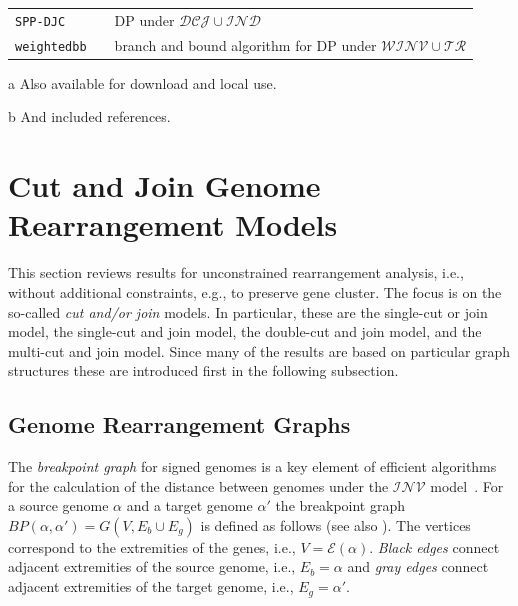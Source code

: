 \documentclass{svmult}
\newcommand{\m}[1]{\mathcal{#1}}
\begin{document}
\begin{table}
\begin{center}
\begin{threeparttable}
\begin{tabular}{l l p{7.2cm}}
		\texttt{SPP-DJC} & \cite{SPP-DJC} & DP under
    $\m{DCJ}\cup\m{IND}$\\
    \texttt{weightedbb} & \cite{Bader_2008,PHYLO}\tnote{b} & branch and
    bound algorithm for DP under $\m{WINV}\cup\m{TR}$\\
    \hline
  \end{tabular}
  \label{table:tools}
  \begin{tablenotes}
    \item[a] Also available for download and local use.
    \item[b] And included references.
\end{tablenotes}
\end{threeparttable}
\end{center}
\end{table}


\section{Cut and Join Genome Rearrangement Models}
\label{sec:x-cut}
%
This section reviews results for unconstrained rearrangement analysis, i.e., 
without additional constraints, e.g., to preserve gene cluster. The focus is on the so-called \emph{cut and/or join} models. 
In particular, these are the single-cut or join model, the single-cut and join model, the double-cut and join model, and the multi-cut 
and join model.
%
Since many of the results are based on particular graph structures these are 
introduced first in the following subsection.

\subsection{Genome Rearrangement Graphs}

The \emph{breakpoint graph} for signed genomes is a key element of efficient
algorithms for the calculation of the distance between genomes under the
$\m{INV}$ model~\cite{Hannenhalli_1999}.
%
For a source genome $\alpha$ and a target genome $\alpha'$ the breakpoint graph
$BP(\alpha,\alpha') = G(V,E_b \cup E_g)$ is defined as follows (see also 
). The vertices correspond to the
extremities of the genes, i.e., $V=\m{E}(\alpha)$. \emph{Black edges} connect
adjacent extremities of the source genome, i.e., $E_b=\alpha$ and \emph{gray edges} connect adjacent extremities of the target
genome, i.e., $E_g=\alpha'$.
\end{document}

